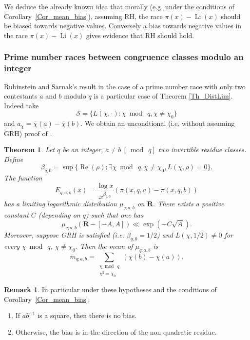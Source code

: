 \documentclass[a4paper,10pt]{amsart}
\theoremstyle{plain}
\newtheorem{theo}{Theorem}[section]
\theoremstyle{definition}
\newtheorem{Rk}{Remark}
\begin{document}
We deduce the already known idea that morally 
(e.g. under the conditions of Corollary~\ref{Cor_mean_bias}), 
assuming RH, the race $\pi(x) - \operatorname{Li}(x)$ should be biased towards negative values. 
Conversely a bias towards negative values in the race $\pi(x) - \operatorname{Li}(x)$  gives evidence that RH should hold.

\subsubsection{Prime number races between congruence classes modulo an integer}\label{subsubsec_ex_cong}

Rubinstein and Sarnak's result \cite[Th. 1.1, Th. 1.2]{RS} in the case of a prime number race with only two contestants $a$ and $b$ modulo $q$ is a particular case of Theorem \ref{Th_DistLim}.
Indeed take $$\mathcal{S}= \lbrace L(\chi,\cdot) : \chi \bmod\ q, \chi\neq \chi_{0}\rbrace$$
and $a_{\chi} = \overline{\chi}(a) - \overline{\chi}(b)$.
We obtain an uncondtional (i.e. without assuming GRH) proof of \cite[Th. 1.1, Th. 1.2]{RS}.

\begin{theo}\label{Th_RS_raceModq}
Let $q$ be an integer, $a \neq b\ [\bmod\ q]$ two invertible residue classes.
Define $$\beta_{q,0} = \sup\lbrace \operatorname{Re}(\rho) : \exists \chi \bmod\ q, \chi\neq \chi_{0},  L(\chi,\rho)=0\rbrace.$$
The function 
$$E_{q;a,b}(x) = \frac{\log x}{x^{\beta_{q,0}}}(\pi(x,q,a) -\pi(x,q,b))$$
has a limiting logarithmic distribution $\mu_{q;a,b}$ on $\mathbf{R}$.
There exists a positive constant $C$ (depending on $q$) such that one has 
$$\mu_{q;a,b}(\mathbf{R}-[-A,A]) \ll \exp(-C\sqrt{A}).$$
Moreover, suppose GRH is satisfied (i.e. $\beta_{q,0}=1/2$) and $L(\chi,1/2)\neq 0$ for every $\chi \bmod\ q$, $\chi\neq \chi_{0}$.
Then the mean of $\mu_{q;a,b}$ is 
$$m_{q;a,b} = \sum_{\substack{\chi \bmod\ q\\ \chi^{2} = \chi_{0}}} (\chi(b) - \chi(a)).$$
\end{theo}

\begin{Rk}
In particular under these hypotheses and the conditions of Corollary~\ref{Cor_mean_bias}.
\begin{enumerate}
\item If $ab^{-1}$ is a square, then there is no bias. 
\item Otherwise, the bias is in the direction of the non quadratic residue.
\end{enumerate}
\end{Rk}
\end{document}
